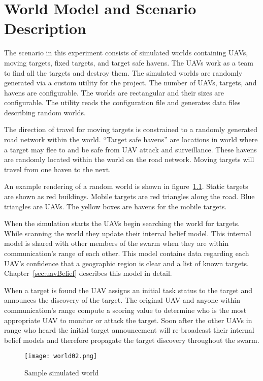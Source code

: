 \chapter{World Model and Scenario Description}

The scenario in this experiment consists of simulated worlds containing UAVs, moving targets, fixed targets, and target safe havens.  The UAVs work as a team to find all the targets and destroy them.  The simulated worlds are randomly generated via a custom utility for the project.  The number of UAVs, targets, and havens are configurable.  The worlds are rectangular and their sizes are configurable.  The utility reads the configuration file and generates data files describing random worlds.  


The direction of travel for moving targets is constrained to a randomly generated road network within the world.  ``Target safe havens'' are locations in world where a target may flee to and be safe from UAV attack and surveillance.  These havens are randomly located within the world on the road network.  Moving targets will travel from one haven to the next.

An example rendering of a random world is shown in figure~\ref{fig:sample_world}. Static targets are shown as red buildings.  Mobile targets are red triangles along the road.  Blue triangles are UAVs.  The yellow boxes are havens for the mobile targets.

When the simulation starts the UAVs begin searching the world for targets.  While scanning the world they update their internal belief model.  This internal model is shared with other members of the swarm when they are within communication's range of each other.  This model contains data regarding each UAV's confidence that a geographic region is clear and a list of known targets.  Chapter~\ref{sec:uavBelief} describes this model in detail.

When a target is found the UAV assigns an initial task status to the target and announces the discovery of the target.  The original UAV and anyone within communication's range compute a scoring value to determine who is the most appropriate UAV to monitor or attack the target.  Soon after the other UAVs in range who heard the initial target announcement will re-broadcast their internal belief models and therefore propagate the target discovery throughout the swarm.


\begin{figure}[H]
	\centering
	\texttt{[image: world02.png]}
	\caption{Sample simulated world}
	\label{fig:sample_world}
\end{figure}

